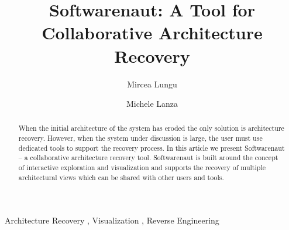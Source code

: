 \documentclass[preprint,12pt]{elsarticle}
\begin{document}
\begin{frontmatter}



\title{Softwarenaut: A Tool for Collaborative Architecture Recovery}


\author{Mircea Lungu}
\address{Software Composition Group\\University of Bern, Switzerland}

\author{Michele Lanza}
\address{REVEAL \\University of Lugano, Switzerland}


\begin{abstract}
When the initial architecture of the system has eroded the 
only solution is architecture recovery. However, when the 
system under discussion is large, the user must use dedicated
tools to support the recovery process. In this article we present 
Softwarenaut -- a collaborative architecture recovery tool.
Softwarenaut is built around the concept of interactive exploration
and visualization and supports the recovery of multiple architectural
views which can be shared with other users and tools. 
\end{abstract}

\begin{keyword}
Architecture Recovery \sep
Visualization \sep
Reverse Engineering
\end{keyword}

\end{frontmatter}

\end{document}
